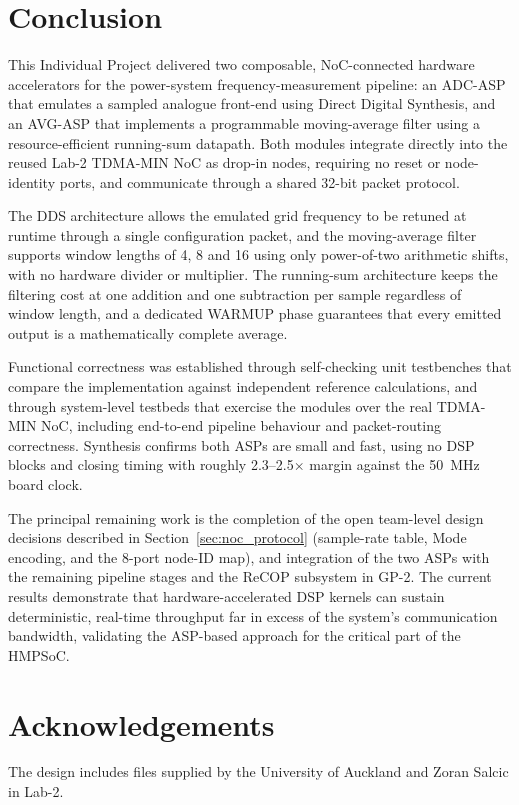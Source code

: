 \documentclass[10pt, a4paper]{article}
\begin{document}
\section{Conclusion}
\label{sec:conclusion}

This Individual Project delivered two composable, NoC-connected hardware accelerators for the power-system frequency-measurement pipeline: an ADC-ASP that emulates a sampled analogue front-end using Direct Digital Synthesis, and an AVG-ASP that implements a programmable moving-average filter using a resource-efficient running-sum datapath. Both modules integrate directly into the reused Lab-2 TDMA-MIN NoC as drop-in nodes, requiring no reset or node-identity ports, and communicate through a shared 32-bit packet protocol.

The DDS architecture allows the emulated grid frequency to be retuned at runtime through a single configuration packet, and the moving-average filter supports window lengths of 4, 8 and 16 using only power-of-two arithmetic shifts, with no hardware divider or multiplier. The running-sum architecture keeps the filtering cost at one addition and one subtraction per sample regardless of window length, and a dedicated WARMUP phase guarantees that every emitted output is a mathematically complete average.

Functional correctness was established through self-checking unit testbenches that compare the implementation against independent reference calculations, and through system-level testbeds that exercise the modules over the real TDMA-MIN NoC, including end-to-end pipeline behaviour and packet-routing correctness. Synthesis confirms both ASPs are small and fast, using no DSP blocks and closing timing with roughly 2.3--2.5$\times$ margin against the 50~MHz board clock.

The principal remaining work is the completion of the open team-level design decisions described in Section~\ref{sec:noc_protocol} (sample-rate table, Mode encoding, and the 8-port node-ID map), and integration of the two ASPs with the remaining pipeline stages and the ReCOP subsystem in GP-2. The current results demonstrate that hardware-accelerated DSP kernels can sustain deterministic, real-time throughput far in excess of the system's communication bandwidth, validating the ASP-based approach for the critical part of the HMPSoC.

\section{Acknowledgements}

The design includes files supplied by the University of Auckland and Zoran Salcic in Lab-2.
\end{document}
